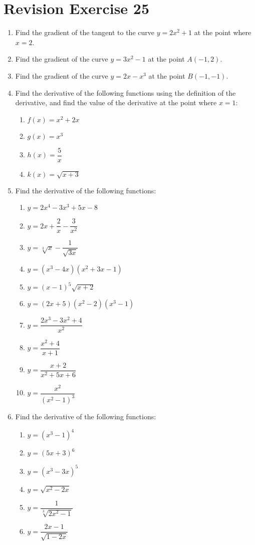 \documentclass[12pt]{report}
\begin{document}
\section{Revision Exercise 25}

\begin{enumerate}
    \item Find the gradient of the tangent to the curve $y = 2x^2 + 1$ at the point where
          $x = 2$.
    \item Find the gradient of the curve $y = 3x^2 - 1$ at the point $A(-1, 2)$.
    \item Find the gradient of the curve $y = 2x - x^3$ at the point $B(-1, -1)$.
    \item Find the derivative of the following functions using the definition of the
          derivative, and find the value of the derivative at the point where $x = 1$:
          \begin{enumerate}
              \item $f (x) = x^2 + 2x$
              \item $g(x) = x^3$
              \item $h(x) = \dfrac{5}{x}$
              \item $k(x) = \sqrt{x + 3}$
          \end{enumerate}
    \item Find the derivative of the following functions:
          \begin{enumerate}
              \item $y=2x^{4}-3x^{3}+5x-8$
              \item $y=2x+{\dfrac{2}{x}}-{\dfrac{3}{x^{2}}}$
              \item $y=\sqrt[3]{x}-{\dfrac{1}{\sqrt{3x}}}$
              \item $y=\left(x^{3}-4x\right)\left(x^{2}+3x-1\right)$
              \item $y={(x-1)}^{5}{\sqrt{x+2}}$
              \item $y=\left(2x+5\right)\left(x^{2}-2\right)\left(x^{3}-1\right)$
              \item $y={\dfrac{2x^{3}-3x^{2}+4}{x^{2}}}$
              \item $y={\dfrac{x^{2}+4}{x+1}}$
              \item $y={\dfrac{x+2}{x^{2}+5x+6}}$
              \item $y={\dfrac{x^{2}}{{\left(x^{2}-1\right)}^{3}}}$
          \end{enumerate}
    \item Find the derivative of the following functions:
          \begin{enumerate}
              \item $y={\left(x^{3}-1\right)}^{4}$
              \item $y={(5x+3)}^{6}$
              \item $y={\left(x^{3}-3x\right)}^{5}$
              \item $y={\sqrt{x^{2}-2x}}$
              \item $y={\dfrac{1}{\sqrt[3]{2x^{2}-1}}}$
              \item $y={\dfrac{2x-1}{\sqrt{1-2x}}}$
          \end{enumerate}


\end{enumerate}
\end{document}
